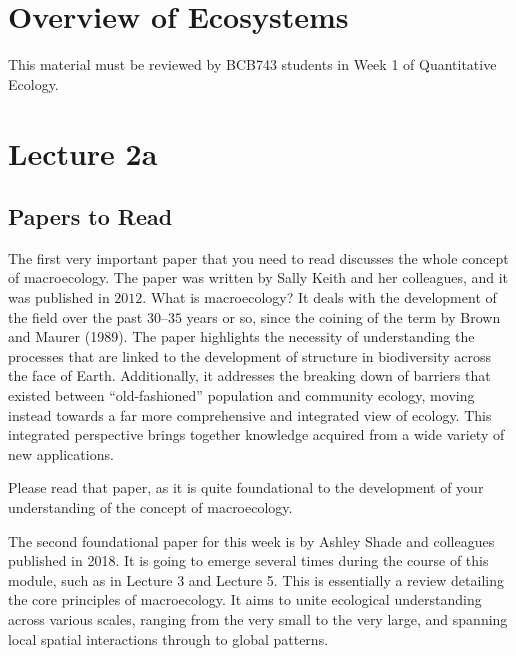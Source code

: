 \documentclass[
  11pt,
]{book}
\begin{document}
\chapter{Overview of Ecosystems}\label{overview-of-ecosystems}

\begin{tcolorbox}[enhanced jigsaw, arc=.35mm, titlerule=0mm, colframe=quarto-callout-note-color-frame, title=\textcolor{quarto-callout-note-color}{\faInfo}\hspace{0.5em}{BCB743}, colbacktitle=quarto-callout-note-color!10!white, opacityback=0, rightrule=.15mm, coltitle=black, left=2mm, bottomtitle=1mm, toptitle=1mm, toprule=.15mm, bottomrule=.15mm, leftrule=.75mm, opacitybacktitle=0.6, colback=white, breakable]

This material must be reviewed by BCB743 students in Week 1 of
Quantitative Ecology.

\end{tcolorbox}

\chapter*{Lecture 2a}\label{lecture-2a}

\section{Papers to Read}\label{papers-to-read}

The first very important paper that you need to read discusses the whole
concept of macroecology. The paper was written by Sally Keith and her
colleagues, and it was published in \(2012\). What is macroecology? It
deals with the development of the field over the past \(30\text{--}35\)
years or so, since the coining of the term by Brown and Maurer (1989).
The paper highlights the necessity of understanding the processes that
are linked to the development of structure in biodiversity across the
face of Earth. Additionally, it addresses the breaking down of barriers
that existed between ``old-fashioned'' population and community ecology,
moving instead towards a far more comprehensive and integrated view of
ecology. This integrated perspective brings together knowledge acquired
from a wide variety of new applications.

Please read that paper, as it is quite foundational to the development
of your understanding of the concept of macroecology.

The second foundational paper for this week is by Ashley Shade and
colleagues published in 2018. It is going to emerge several times during
the course of this module, such as in Lecture 3 and Lecture 5. This is
essentially a review detailing the core principles of macroecology. It
aims to unite ecological understanding across various scales, ranging
from the very small to the very large, and spanning local spatial
interactions through to global patterns.
\end{document}
